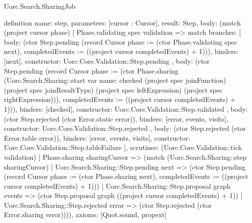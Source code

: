 \begin{lexlean}{Uorc.Search.SharingJob}
\begin{semanticmodule}
definition{
  name: step,
  parameters: [cursor : Cursor],
  result: Step,
  body: (match (project cursor phase)
    | Phase.validating spec validation => match{
      branches: [
        {
          body: (ctor Step.pending (record Cursor {phase := (ctor Phase.validating spec next), completedEvents := ((project cursor completedEvents) + 1)})),
          binders: [next],
          constructor: Uorc.Core.Validation::Step.pending
        },
        {
          body: (ctor Step.pending (record Cursor {phase := (ctor Phase.sharing (Uorc.Search.Sharing::start var{
            name: checked
          } (project spec joinFunction) (project spec joinResultType) (project spec leftExpression) (project spec rightExpression))), completedEvents := ((project cursor completedEvents) + 1)})),
          binders: [checked],
          constructor: Uorc.Core.Validation::Step.validated
        },
        {
          body: (ctor Step.rejected (ctor Error.static error)),
          binders: [error, events, visits],
          constructor: Uorc.Core.Validation::Step.rejected
        },
        {
          body: (ctor Step.rejected (ctor Error.table error)),
          binders: [error, events, visits],
          constructor: Uorc.Core.Validation::Step.tableFailure
        }
      ],
      scrutinee: (Uorc.Core.Validation::tick validation)
    }
    | Phase.sharing sharingCursor => (match (Uorc.Search.Sharing::step sharingCursor)
      | Uorc.Search.Sharing::Step.pending next => (ctor Step.pending (record Cursor {phase := (ctor Phase.sharing next), completedEvents := ((project cursor completedEvents) + 1)}))
      | Uorc.Search.Sharing::Step.proposal graph events => (ctor Step.proposal graph ((project cursor completedEvents) + 1))
      | Uorc.Search.Sharing::Step.rejected error => (ctor Step.rejected (ctor Error.sharing error)))),
  axioms: [Quot.sound, propext]
}
\end{semanticmodule}
\end{lexlean}
